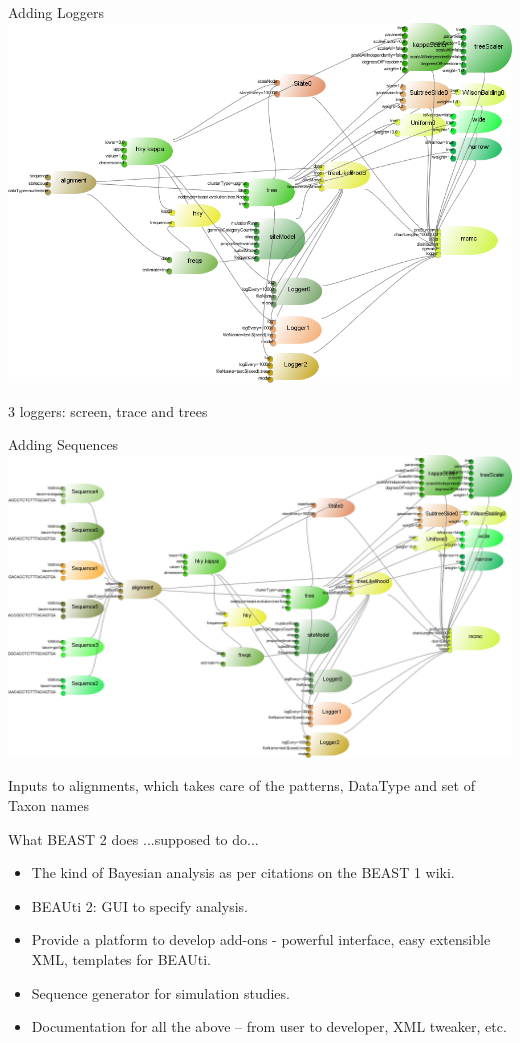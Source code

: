 \documentclass{beamer}
\theoremstyle{definition}
\begin{document}
\begin{frame}{Adding Loggers}
\includegraphics[width=\textwidth]{example5.png}

3 loggers: screen, trace and trees
\end{frame}
\begin{frame}{Adding Sequences}
\includegraphics[width=\textwidth]{example6.png}

Inputs to alignments, which takes care of the patterns, DataType and set of Taxon names
\end{frame}


\begin{frame}{What BEAST 2 does}
...supposed to do...

\begin{itemize}
\item The kind of Bayesian analysis as per citations on the BEAST 1 wiki.
\item BEAUti 2: GUI to specify analysis.
\item Provide a platform to develop add-ons - powerful interface, easy extensible XML, templates for BEAUti.
\item Sequence generator for simulation studies.
\item Documentation for all the above -- from user to developer, XML tweaker, etc.
\end{itemize}

\end{frame}
\end{document}
